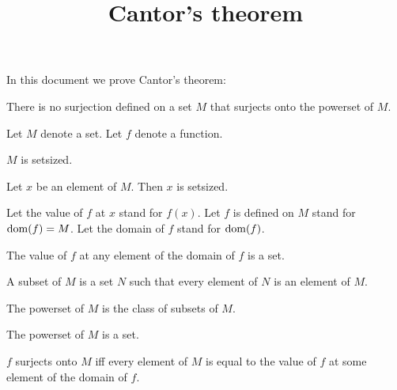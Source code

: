 \documentclass{article}
\title{Cantor's theorem}
\author{}
\date{}
\begin{document}

  \maketitle

  In this document we prove Cantor's theorem:

  \begin{quotedtheorem}
    There is no surjection defined on a set $M$ that surjects onto the powerset of $M$.
  \end{quotedtheorem}

  \begin{forthel}

    Let $M$ denote a set. Let $f$ denote a function.

    \begin{axiom}
        $M$ is setsized.
    \end{axiom}

    \begin{axiom}
        Let $x$ be an element of $M$. Then $x$ is setsized.
    \end{axiom}

    Let the value of $f$ at $x$ stand for $f(x)$.
    Let $f$ is defined on $M$ stand for $\operatorname{dom}(f) = M$.
    Let the domain of $f$ stand for $\operatorname{dom}(f)$.


    \begin{axiom}
      The value of $f$ at any element of the domain of $f$ is a set.
    \end{axiom}

    \begin{definition}[Subset]
      A subset of $M$ is a set $N$ such that every element of $N$ is an element of $M$.
    \end{definition}

    \begin{definition}
      The powerset of $M$ is the class of subsets of $M$.
    \end{definition}

    \begin{axiom}
      The powerset of $M$ is a set.
    \end{axiom}

    \begin{definition}
      $f$ surjects onto $M$ iff every element of $M$ is equal to the value of $f$ at some element of the domain of $f$.
    \end{definition}


\end{forthel}
\end{document}
